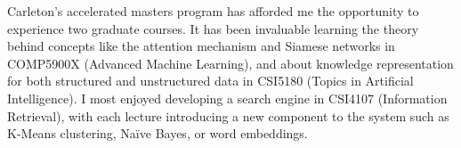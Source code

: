 Carleton's accelerated masters program has afforded me the opportunity to experience two graduate courses. It has been invaluable learning the theory behind concepts like the attention mechanism and Siamese networks in COMP5900X (Advanced Machine Learning), and about knowledge representation for both structured and unstructured data in CSI5180 (Topics in Artificial Intelligence). I most enjoyed developing a search engine in CSI4107 (Information Retrieval), with each lecture introducing a new component to the system such as K-Means clustering, Naïve Bayes, or word embeddings. %

